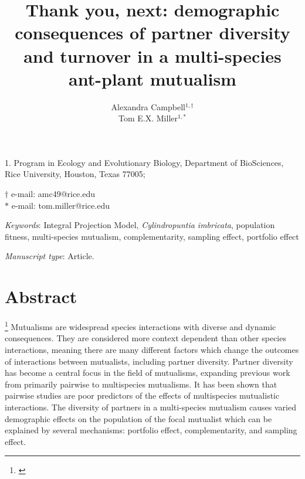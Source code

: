 \documentclass[11pt]{article}
\title{Thank you, next: demographic consequences of partner diversity and turnover in a multi-species ant-plant mutualism}
\author{Alexandra Campbell$^{1,\dagger}$ \\ 
	Tom E.X. Miller$^{1,\ast}$}
\date{}
\newcommand{\tom}[2]{{\color{red}{#1}}\footnote{\textit{\color{red}{#2}}}}
\begin{document}
	
	\maketitle
	
	\noindent{} 1. Program in Ecology and Evolutionary Biology, Department of BioSciences, Rice University, Houston, Texas 77005;
	
	\noindent{} $\dagger$ e-mail: amc49@rice.edu\\
	\noindent{} $\ast$ e-mail: tom.miller@rice.edu
	
	\bigskip
	
	\textit{Keywords}:  Integral Projection Model, \textit{Cylindropuntia imbricata}, population fitness, multi-species mutualism, complementarity, sampling effect, portfolio effect
	
	\bigskip
	
	\textit{Manuscript type}: Article.
	
	\bigskip
	
	
\linenumbers{}
\modulolinenumbers[3]

\newpage{}

\section*{Abstract}
\tom{}{I think this is too long for Am Nat requirements. Also, use ``we''. I think you just pasted in an abstract that you used elsewhere, so I will work on this once you write a real abstract for the Am Nat paper.}
Mutualisms are widespread species interactions with diverse and dynamic consequences. 
They are considered more context dependent than other species interactions, meaning there are many different factors which change the outcomes of interactions between mutualists, including partner diversity. 
Partner diversity has become a central focus in the field of mutualisms, expanding previous work from primarily pairwise to multispecies mutualisms. 
It has been shown that pairwise studies are poor predictors of the effects of multispecies mutualistic interactions. 
The diversity of partners in a multi-species mutualism causes varied demographic effects on the population of the focal mutualist which can be explained by several mechanisms: portfolio effect, complementarity, and sampling effect. 
\end{document}
